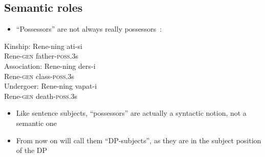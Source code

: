 \documentclass[letterpaper,12pt]{article}
\newcommand{\poss}[2]{\textsc{poss}.{\footnotesize #1}#2}
\newcommand{\gen}{\textsc{gen}}
\begin{document}
\subsection{Semantic roles}
\begin{itemize}
\item ``Possessors'' are not always really possessors~\cite{Dede}:
\end{itemize}
\begin{exe}
\ex
	\begin{xlist}
	\ex	Kinship:
			\gll Rene-ning ati-si\\
					 Rene-\gen{}  father-\poss{3}{s}\\
	\ex Association:
			\gll Rene-ning ders-i\\
				   Rene-\gen{} class-\poss{3}{s}\\
	\ex Undergoer:
			\gll Rene-ning vapat-i\\
					 Rene-\gen{}  death-\poss{3}{s}\\
	\end{xlist}
\end{exe}
\begin{itemize}
\item Like sentence subjects, ``possessors'' are actually a syntactic notion, not a semantic one
\item From now on will call them ``DP-subjects'', as they are in the subject position of the DP
\end{itemize}
\end{document}

